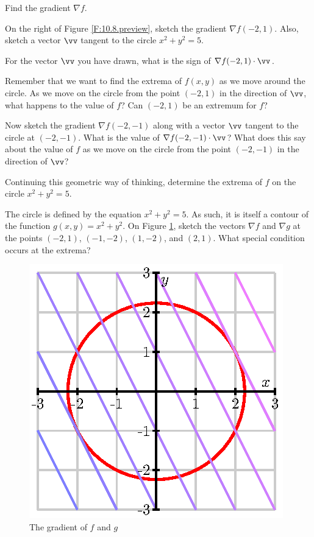 \begin{pa}
  \ba
\item Find the gradient $\nabla f$.
\item On the right of Figure \ref{F:10.8.preview}, sketch the gradient
  $\nabla f(-2,1)$.  Also, sketch a vector $\vv$ tangent to the circle
  $x^2+y^2 = 5$.  
\item For the vector $\vv$ you have drawn, what is the sign of $\nabla
  f(-2,1)\cdot\vv$.  
\item Remember that we want to find the extrema of $f(x,y)$
  as we move around the circle.  As we move on the circle from the
  point $(-2,1)$ in the direction of $\vv$, what happens to the value
  of $f$?  Can $(-2,1)$ be an extremum for $f$?
\item Now sketch the gradient $\nabla f(-2,-1)$ along with a vector
  $\vv$ tangent to the circle at $(-2,-1)$.  What is the value of
  $\nabla f(-2,-1)\cdot\vv$?  What does this say about the value of
  $f$ as we move on the circle from the point $(-2,-1)$ in the
  direction of $\vv$?
\item Continuing this geometric way of thinking, determine
  the extrema of $f$ on the circle $x^2+y^2=5$.
\item The circle is defined by the equation $x^2+y^2 =5$.  As such, it
  is itself a contour of the function $g(x,y) = x^2 + y^2$.  On Figure
  \ref{F:10.8.preview.draw}, sketch the vectors $\nabla f$ and $\nabla
  g$ at the points $(-2,1)$, $(-1,-2)$, $(1,-2)$, and $(2,1)$.  What
  special condition occurs at the extrema?

\begin{figure}[ht]
  \begin{center}
    \includegraphics{figures/fig_10_8_preview_draw.eps}
  \end{center}
  \caption{The gradient of $f$ and $g$}
  \label{F:10.8.preview.draw}
\end{figure}
  \ea
\end{pa} 
\afterpa 